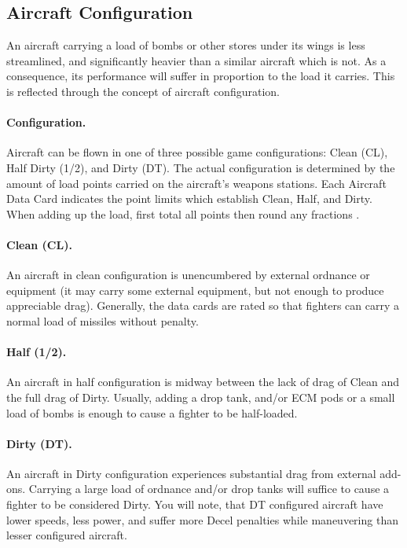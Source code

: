 \advancedrules

\subsection{Aircraft Configuration}

An aircraft carrying a load of bombs or other stores under its wings is less streamlined, and significantly heavier than a similar aircraft which is not. As a consequence, its performance will suffer in proportion to the load it carries. This is reflected through the concept of aircraft configuration.

\paragraph{Configuration.} Aircraft can be flown in one of three possible game configurations: Clean (CL), Half Dirty (1/2), and Dirty (DT). The actual configuration is determined by the amount of load points carried on the aircraft's weapons stations.  Each Aircraft Data Card indicates the point limits which establish Clean, Half, and Dirty. When adding up the load, first total all points then round any fractions .

\paragraph{Clean (CL).} An aircraft in clean configuration is unencumbered by external ordnance or equipment (it may carry some external equipment, but not enough to produce appreciable drag). Generally, the data cards are rated so that fighters can carry a normal load of missiles without penalty.

\paragraph{Half (1/2).} An aircraft in half configuration is midway between the lack of drag of Clean and the full drag of Dirty. Usually, adding a drop tank, and/or ECM pods or a small load of bombs is enough to cause a fighter to be half-loaded.

\paragraph{Dirty (DT).} An aircraft in Dirty configuration experiences substantial drag from external add-ons. Carrying a large load of ordnance and/or drop tanks will suffice to cause a fighter to be considered Dirty. You will note, that DT configured aircraft have lower speeds, less power, and suffer more Decel penalties while maneuvering than lesser configured aircraft.

